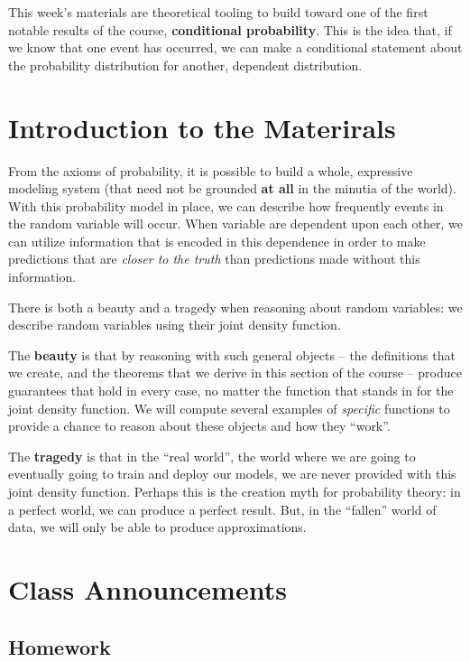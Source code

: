\documentclass[
]{book}
\theoremstyle{definition}
\theoremstyle{definition}
\theoremstyle{definition}
\theoremstyle{definition}
\theoremstyle{remark}
\begin{document}
This week's materials are theoretical tooling to build toward one of the first notable results of the course, \textbf{conditional probability}. This is the idea that, if we know that one event has occurred, we can make a conditional statement about the probability distribution for another, dependent distribution.

\section{Introduction to the Materirals}\label{introduction-to-the-materirals}

From the axioms of probability, it is possible to build a whole, expressive modeling system (that need not be grounded \textbf{at all} in the minutia of the world). With this probability model in place, we can describe how frequently events in the random variable will occur. When variable are dependent upon each other, we can utilize information that is encoded in this dependence in order to make predictions that are \emph{closer to the truth} than predictions made without this information.

There is both a beauty and a tragedy when reasoning about random variables: we describe random variables using their joint density function.

The \textbf{beauty} is that by reasoning with such general objects -- the definitions that we create, and the theorems that we derive in this section of the course -- produce guarantees that hold in every case, no matter the function that stands in for the joint density function. We will compute several examples of \emph{specific} functions to provide a chance to reason about these objects and how they ``work''.

The \textbf{tragedy} is that in the ``real world'', the world where we are going to eventually going to train and deploy our models, we are never provided with this joint density function. Perhaps this is the creation myth for probability theory: in a perfect world, we can produce a perfect result. But, in the ``fallen'' world of data, we will only be able to produce approximations.

\section{Class Announcements}\label{class-announcements}

\subsection*{Homework}\label{homework}
\end{document}

